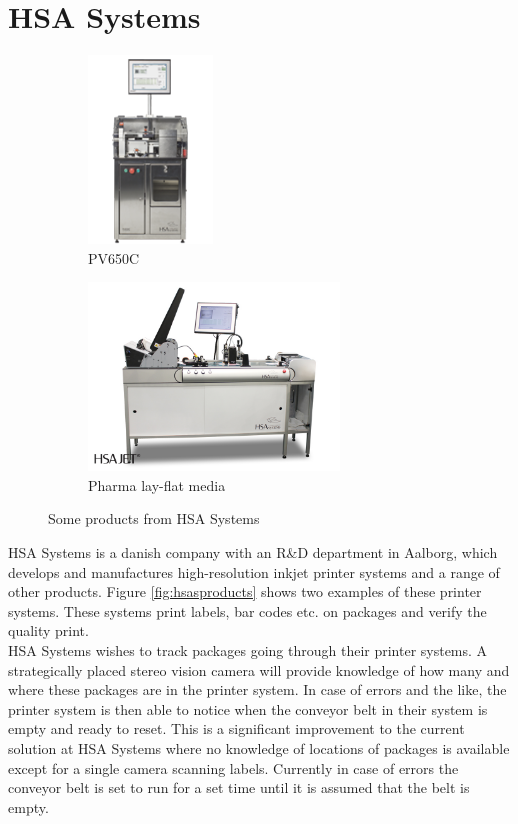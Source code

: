 \section{HSA Systems}
\begin{figure}[ht!]
  \centering
  \begin{subfigure}[t]{0.45\textwidth}
    \centering\includegraphics[height=5cm]{figures/pv650_225px}
    \caption{PV650C\cite{HSAsystems}}
    \label{fig:pv650c}
  \end{subfigure}\hspace{0.5cm}
  \begin{subfigure}[t]{0.45\textwidth}
    \centering\includegraphics[height=5cm]{figures/layflat1_big}
    \caption{Pharma lay-flat media \cite{HSAsystems}\label{fig:layflat}}
  \end{subfigure}
  \caption{Some products from HSA Systems \label{fig:hsasproducts}}
\end{figure}
HSA Systems is a danish company with an R\&D department in Aalborg, which develops and manufactures high-resolution inkjet printer systems and a range of other products. Figure \vref{fig:hsasproducts} shows two examples of these printer systems. These systems print labels, bar codes etc. on packages and verify the quality print.\\

HSA Systems wishes to track packages going through their printer systems. A strategically placed stereo vision camera will provide knowledge of how many and where these packages are in the printer system. In case of errors and the like, the printer system is then able to notice when the conveyor belt in their system is empty and ready to reset. This is a significant improvement to the current solution at HSA Systems where no knowledge of locations of packages is available except for a single camera scanning labels. Currently in case of errors the conveyor belt is set to run for a set time until it is assumed that the belt is empty.\\

